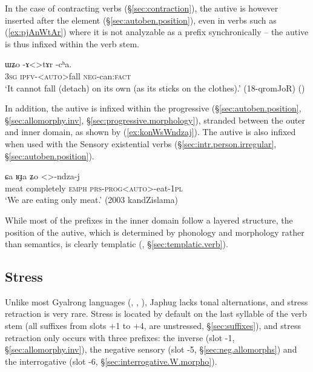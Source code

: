 In the case of contracting verbs (§\ref{sec:contraction}), the autive is however inserted after the  element (§\ref{sec:autoben.position}), even in verbs such as   (\ref{ex:pjAnWtAr}) where it is not analyzable as a prefix synchronically -- the autive is thus infixed within the verb stem.

\begin{exe}
\ex \label{ex:pjAnWtAr}
\gll ɯʑo -ɤ<>tɤr -cʰa. \\
\textsc{3sg} \textsc{ipfv}-<\textsc{auto}>fall \textsc{neg}-can:\textsc{fact} \\
\glt `It cannot fall (detach) on its own (as its sticks on the clothes).' (18-qromJoR) ()
\end{exe}

In addition, the autive is infixed within the progressive  (§\ref{sec:autoben.position}, §\ref{sec:allomorphy.inv}, §\ref{sec:progressive.morphology}), stranded between the outer and inner domain, as shown by (\ref{ex:konWsWndzaj}). The autive is also infixed when used with the Sensory existential verbs (§\ref{sec:intr.person.irregular}, §\ref{sec:autoben.position}).

\begin{exe}
\ex \label{ex:konWsWndzaj}
\gll ɕa ʁɟa ʑo <>-ndza-j \\
meat completely \textsc{emph} \textsc{prs}-\textsc{prog}<\textsc{auto}>-eat-\textsc{1pl} \\
\glt `We are eating only meat.' (2003 kandZislama)
\end{exe}

While most of the prefixes in the inner domain follow a layered structure, the position of the autive, which is determined by phonology and morphology rather than semantics, is clearly templatic (\citealt[218]{bickel07inflectional}, §\ref{sec:templatic.verb}).

 

\subsection{Stress} \label{sec:stress.prefixal.chain}
Unlike most Gyalrong languages (\citealt{jackson05yingao}, \citealt{linyj12tone}, \citealt[69--81]{gong18these}), Japhug lacks tonal alternations, and stress retraction is very rare. Stress is located by default on the last syllable of the verb stem (all suffixes from slots +1 to +4, are unstressed, §\ref{sec:suffixes}), and stress retraction only occurs with three prefixes: the inverse   (slot -1, §\ref{sec:allomorphy.inv}), the  negative sensory  (slot -5, §\ref{sec:neg.allomorphs}) and the interrogative  (slot -6, §\ref{sec:interrogative.W.morpho}).

